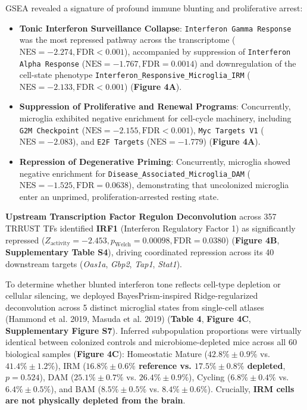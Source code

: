 \documentclass[10pt,a4paper]{article}
\begin{document}
GSEA revealed a signature of profound immune blunting and proliferative arrest:
\begin{itemize}
\item \textbf{Tonic Interferon Surveillance Collapse}: \texttt{\small Interferon Gamma Response} was the most repressed pathway across the transcriptome ($\text{NES} = -2.274, \text{FDR} < 0.001$), accompanied by suppression of \texttt{\small Interferon Alpha Response} ($\text{NES} = -1.767, \text{FDR} = 0.0014$) and downregulation of the cell-state phenotype \texttt{\small Interferon\_Responsive\_Microglia\_IRM} ($\text{NES} = -2.133, \text{FDR} < 0.001$) (\textbf{Figure 4A}).
\item \textbf{Suppression of Proliferative and Renewal Programs}: Concurrently, microglia exhibited negative enrichment for cell-cycle machinery, including \texttt{\small G2M Checkpoint} ($\text{NES} = -2.155, \text{FDR} < 0.001$), \texttt{\small Myc Targets V1} ($\text{NES} = -2.083$), and \texttt{\small E2F Targets} ($\text{NES} = -1.779$) (\textbf{Figure 4A}).
\item \textbf{Repression of Degenerative Priming}: Concurrently, microglia showed negative enrichment for \texttt{\small Disease\_Associated\_Microglia\_DAM} ($\text{NES} = -1.525, \text{FDR} = 0.0638$), demonstrating that uncolonized microglia enter an unprimed, proliferation-arrested resting state.
\end{itemize}
\textbf{Upstream Transcription Factor Regulon Deconvolution} across 357 TRRUST TFs identified \textbf{IRF1} (Interferon Regulatory Factor 1) as significantly repressed ($Z_{\text{activity}} = -2.453, p_{\text{Welch}} = 0.00098, \text{FDR} = 0.0380$) (\textbf{Figure 4B}, \textbf{Supplementary Table S4}), driving coordinated repression across its 40 downstream targets (\textit{Oas1a}, \textit{Gbp2}, \textit{Tap1}, \textit{Stat1}).

To determine whether blunted interferon tone reflects cell-type depletion or cellular silencing, we deployed BayesPrism-inspired Ridge-regularized deconvolution across 5 distinct microglial states from single-cell atlases (Hammond et al. 2019, Masuda et al. 2019)\cite{hammond2019_37,masuda2019_38} (\textbf{Table 4}, \textbf{Figure 4C}, \textbf{Supplementary Figure S7}). Inferred subpopulation proportions were virtually identical between colonized controls and microbiome-depleted mice across all 60 biological samples (\textbf{Figure 4C}): Homeostatic Mature ($42.8\% \pm 0.9\%$ vs. $41.4\% \pm 1.2\%$), IRM (\textbf{$16.8\% \pm 0.6\%$ reference vs. $17.5\% \pm 0.8\%$ depleted}, $p = 0.524$), DAM ($25.1\% \pm 0.7\%$ vs. $26.4\% \pm 0.9\%$), Cycling ($6.8\% \pm 0.4\%$ vs. $6.4\% \pm 0.5\%$), and BAM ($8.5\% \pm 0.5\%$ vs. $8.4\% \pm 0.6\%$). Crucially, \textbf{IRM cells are not physically depleted from the brain}. 
\end{document}
